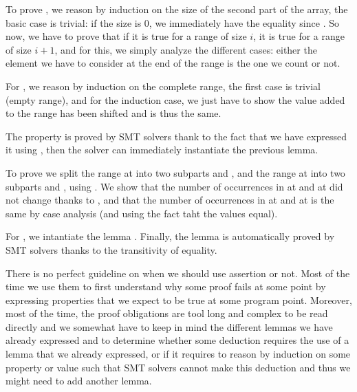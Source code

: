 To prove , we reason by induction on the size
of the second part of the array, the basic case is trivial: if the size is 0, we
immediately have the equality since . So now, we have
to prove that if it is true for a range of size $i$, it is true for a range of
size $i+1$, and for this, we simply analyze the different cases: either the
element we have to consider at the end of the range is the one we count or not.


For , we reason by induction on the complete
range, the first case is trivial (empty range), and for the induction case, we
just have to show the value added to the range has been shifted and is thus the
same.


The property  is proved by SMT solvers
thank to the fact that we have expressed it using , then the
solver can immediately instantiate the previous lemma.


To prove  we split the range at
 into two subparts  and
, and the range at  into two subparts
 and , using
. We show that the number of occurrences in
 at  and  at
 did not change thanks to ,
and that the number of occurrences in  at
 and  at  is the same by
case analysis (and using the fact taht the values equal).


For , we intantiate the lemma
. Finally, the lemma
 is automatically proved by SMT solvers
thanks to the transitivity of equality.




There is no perfect guideline on when we should use assertion or not. Most of
the time we use them to first understand why some proof fails at some point by
expressing properties that we expect to be true at some program point. Moreover,
most of the time, the proof obligations are tool long and complex to be read
directly and we somewhat have to keep in mind the different lemmas we have
already expressed and to determine whether some deduction requires the use of
a lemma that we already expressed, or if it requires to reason by induction on
some property or value such that SMT solvers cannot make this deduction and thus
we might need to add another lemma.



